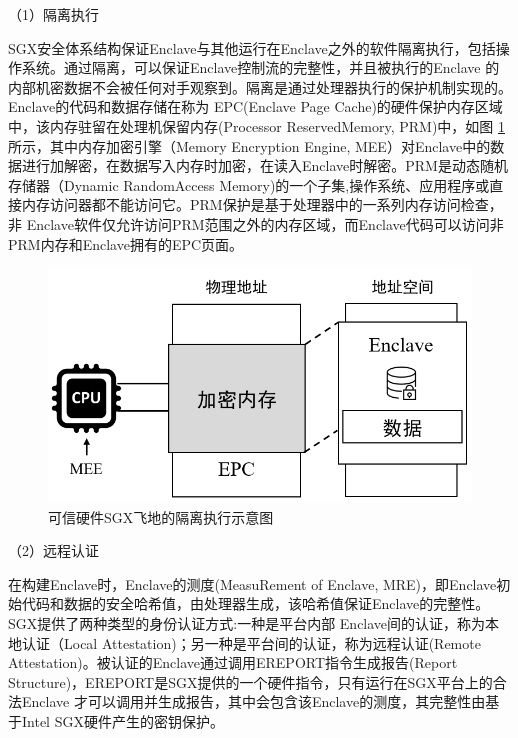 
（1）隔离执行

SGX安全体系结构保证Enclave与其他运行在Enclave之外的软件隔离执行，包括操作系统。通过隔离，可以保证Enclave控制流的完整性，并且被执行的Enclave 的内部机密数据不会被任何对手观察到。隔离是通过处理器执行的保护机制实现的。Enclave的代码和数据存储在称为 EPC(Enclave Page Cache)的硬件保护内存区域中，该内存驻留在处理机保留内存(Processor ReservedMemory, PRM)中，如图 \ref{Sep_Exe} 所示，其中内存加密引擎（Memory Encryption Engine, MEE）对Enclave中的数据进行加解密，在数据写入内存时加密，在读入Enclave时解密。PRM是动态随机存储器（Dynamic RandomAccess Memory)的一个子集,操作系统、应用程序或直接内存访问器都不能访问它。PRM保护是基于处理器中的一系列内存访问检查，非 Enclave软件仅允许访问PRM范围之外的内存区域，而Enclave代码可以访问非PRM内存和Enclave拥有的EPC页面。

\begin{figure}[h]
	\centering
	\includegraphics[width=0.6\linewidth]{figures/sep_exe.png}
	\caption{可信硬件SGX飞地的隔离执行示意图}
	\label{Sep_Exe}
\end{figure}

（2）远程认证

在构建Enclave时，Enclave的测度(MeasuRement of Enclave, MRE)，即Enclave初始代码和数据的安全哈希值，由处理器生成，该哈希值保证Enclave的完整性。SGX提供了两种类型的身份认证方式:一种是平台内部 Enclave间的认证，称为本地认证（Local Attestation)；另一种是平台间的认证，称为远程认证(Remote Attestation)。被认证的Enclave通过调用EREPORT指令生成报告(Report Structure)，EREPORT是SGX提供的一个硬件指令，只有运行在SGX平台上的合法Enclave 才可以调用并生成报告，其中会包含该Enclave的测度，其完整性由基于Intel SGX硬件产生的密钥保护。

